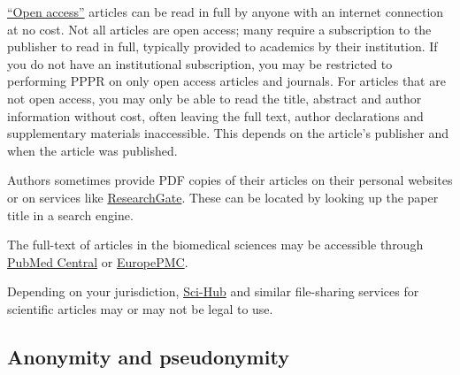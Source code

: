 \documentclass[letterpaper, 12pt]{article}
\begin{document}
\href{https://en.wikipedia.org/wiki/Open_access}{``Open access''} articles can be read in full by anyone with an internet connection at no cost. Not all articles are open access; many require a subscription to the publisher to read in full, typically provided to academics by their institution. If you do not have an institutional subscription, you may be restricted to performing PPPR on only open access articles and journals. For articles that are not open access, you may only be able to read the title, abstract and author information without cost, often leaving the full text, author declarations and supplementary materials inaccessible. This depends on the article's publisher and when the article was published.
 
Authors sometimes provide PDF copies of their articles on their personal websites or on services like \href{https://www.researchgate.net/}{ResearchGate}. These can be located by looking up the paper title in a search engine.

The full-text of articles in the biomedical sciences may be accessible through \href{https://pmc.ncbi.nlm.nih.gov/}{PubMed Central} or \href{https://europepmc.org/}{EuropePMC}.

Depending on your jurisdiction, \href{https://en.wikipedia.org/wiki/Sci-Hub}{Sci-Hub} and similar file-sharing services for scientific articles may or may not be legal to use.

\subsection*{Anonymity and pseudonymity}
\end{document}
